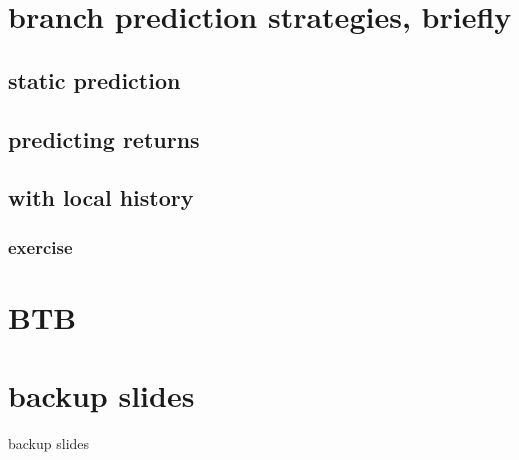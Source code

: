 

\section{branch prediction strategies, briefly}

\subsection{static prediction}


\subsection{predicting returns}


\subsection{with local history}


\subsubsection{exercise}


\section{BTB}


\section{backup slides}
\begin{frame}{backup slides}
\end{frame}
